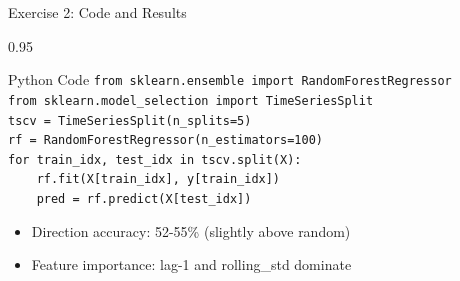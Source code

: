 \documentclass[9pt, aspectratio=169, t]{beamer}
\begin{document}
\begin{frame}{Exercise 2: Code and Results}
    \begin{cminipage}{0.95\textwidth}
    \begin{exampleblock}{Python Code}
        {\footnotesize
        \texttt{from sklearn.ensemble import RandomForestRegressor}\\
        \texttt{from sklearn.model\_selection import TimeSeriesSplit}\\[0.2cm]
        \texttt{tscv = TimeSeriesSplit(n\_splits=5)}\\
        \texttt{rf = RandomForestRegressor(n\_estimators=100)}\\[0.2cm]
        \texttt{for train\_idx, test\_idx in tscv.split(X):}\\
        \texttt{~~~~rf.fit(X[train\_idx], y[train\_idx])}\\
        \texttt{~~~~pred = rf.predict(X[test\_idx])}
        }
    \end{exampleblock}

    \vspace{0.2cm}
    \begin{itemize}\setlength{\itemsep}{0pt}
        \item Direction accuracy: 52-55\% (slightly above random)
        \item Feature importance: lag-1 and rolling\_std dominate
    \end{itemize}
    \end{cminipage}
\end{frame}
\end{document}
